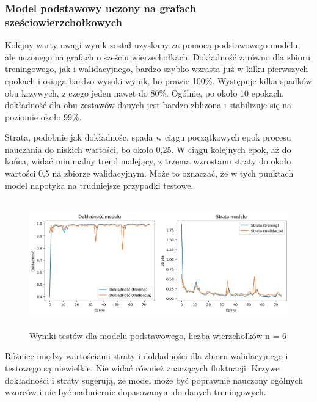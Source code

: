 
\subsubsection{Model podstawowy uczony na grafach sześciowierzchołkowych}

Kolejny warty uwagi wynik został uzyskany za pomocą podstawowego modelu, ale uczonego na grafach o sześciu wierzechołkach.
Dokładność zarówno dla zbioru treningowego, jak i walidacyjnego, bardzo szybko wzrasta już w kilku pierwszych epokach
i osiąga bardzo wysoki wynik, bo prawie 100\%.
Występuje kilka spadków obu krzywych, z czego jeden nawet do 80\%.
Ogólnie, po około 10 epokach, dokładność dla obu zestawów danych jest bardzo zbliżona i stabilizuje się na poziomie około 99\%.

Strata, podobnie jak dokładnośc, spada w ciągu początkowych epok procesu nauczania do niskich wartości, bo około 0,25.
W ciągu kolejnych epok, aż do końca, widać minimalny trend malejący, z trzema wzrostami straty do około wartości 0,5 na zbiorze walidacyjnym.
Może to oznaczać, że w tych punktach model napotyka na trudniejsze przypadki testowe.

\begin{figure}[ht]
	\centering
	\includegraphics[height=5.5cm]{resources/tests/images/v3/base6_img.png}
	\caption{Wyniki testów dla modelu podstawowego, liczba wierzchołków n = 6}
	\label{Fig:tests-base-3a}
\end{figure}
\FloatBarrier

Różnice między wartościami straty i dokładności dla zbioru walidacyjnego i testowego są niewielkie.
Nie widać również znaczących fluktuacji.
Krzywe dokładności i straty sugerują, że model może być poprawnie nauczony ogólnych wzorców
i nie być nadmiernie dopasowanym do danych treningowych.

